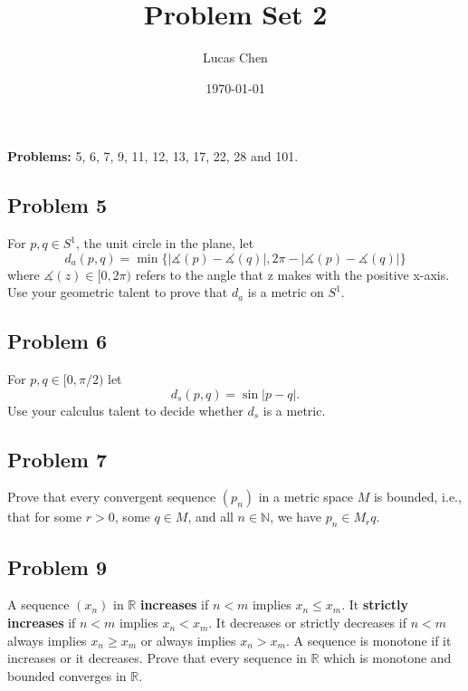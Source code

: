\documentclass{amsart}
\title{Problem Set 2}
\author{Lucas Chen}
\date{\today}
\begin{document}
\maketitle

\textbf{Problems:} 5, 6, 7, 9, 11, 12, 13, 17, 22, 28 and 101.

\subsection*{Problem 5} For $p, q\in S^1$, the unit circle in the plane, let
$$d_a(p, q) = \min\{|\measuredangle(p) - \measuredangle(q)|, 2\pi - |\measuredangle(p) - \measuredangle(q)|\}$$
where $\measuredangle(z)\in[0,2\pi)$ refers to the angle that z makes with the positive x-axis.
Use your geometric talent to prove that $d_a$ is a metric on $S^1$.

\noindent 

\bigskip

\subsection*{Problem 6} For $p,q \in [0,\pi/2)$ let
$$d_s(p, q) = \sin |p - q|.$$
Use your calculus talent to decide whether $d_s$ is a metric.

\noindent

\bigskip

\subsection*{Problem 7} Prove that every convergent sequence $(p_n)$ in a metric space $M$ is bounded, i.e.,
that for some $r>0$, some $q\in M$, and all $n\in \mathbb{N}$, we have $p_n\in M_rq.$

\noindent

\bigskip

\subsection*{Problem 9} A sequence $(x_n)$ in $\mathbb{R}$ \textbf{increases} if $n < m$ implies $x_n\leq x_m$. 
It \textbf{strictly increases} if $n < m$ implies $x_n < x_m$. It decreases or strictly decreases if $n < m$ 
always implies $x_n\geq x_m$ or always implies $x_n > x_m$. A sequence is monotone if it increases or it decreases. 
Prove that every sequence in $\mathbb{R}$ which is monotone and bounded converges in $\mathbb{R}.$

\noindent
\end{document}
